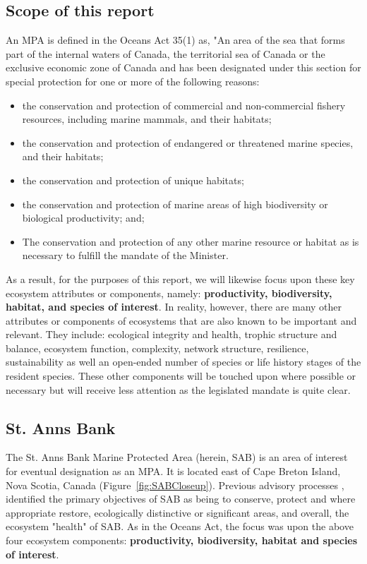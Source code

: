 \documentclass[letterpaper,portrait,11pt]{scrartcl}
\numberwithin{equation}{section}		%
\numberwithin{figure}{section}		%
\numberwithin{table}{section}				%
\begin{document}
\subsection{Scope of this report}
An MPA is defined in the Oceans Act 35(1) as, "An area of the sea that forms part of the internal waters of Canada, the territorial sea of Canada or the exclusive economic zone of Canada and has been designated under this section for special protection for one or more of the following reasons: 

\begin{itemize}
  \item the conservation and protection of commercial and non-commercial fishery resources, including marine mammals, and their habitats; 
  \item the conservation and protection of endangered or threatened marine species, and their habitats; 
  \item the conservation and protection of unique habitats; 
  \item the conservation and protection of marine areas of high biodiversity or biological productivity; and; 
  \item The conservation and protection of any other marine resource or habitat as is necessary to fulfill the mandate of the Minister.
\end{itemize}

As a result, for the purposes of this report, we will likewise focus upon these key ecosystem attributes or components, namely: \textbf{productivity, biodiversity, habitat, and  species of interest}. In reality, however, there are many other attributes or components of ecosystems that are also known to be important and relevant. They include: ecological integrity and health, trophic structure and balance, ecosystem function, complexity, network structure, resilience, sustainability as well an open-ended number of species or life history stages of the resident species. These other components will be touched upon where possible or necessary but will receive less attention as the legislated mandate is quite clear. 

\subsection{St. Anns Bank}
The St. Anns Bank Marine Protected Area (herein, SAB) is an area of interest for eventual designation as an MPA. It is located east of Cape Breton Island, Nova Scotia, Canada (Figure~\ref{fig:SABCloseup}). Previous advisory processes \parencites{DFO:2012:conservation, Kenchington:2013:sab}, identified the primary objectives of SAB as being to conserve, protect and where appropriate restore, ecologically distinctive or significant areas, and overall, the ecosystem "health" of SAB. As in the Oceans Act, the focus was upon the above four ecosystem components: \textbf{productivity, biodiversity, habitat and species of interest}.
\end{document}
